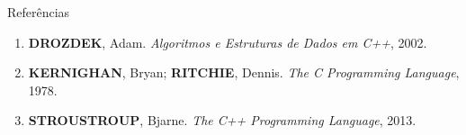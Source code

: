 \begin{frame}[fragile]{Referências}

    \begin{enumerate}
        \item \textbf{DROZDEK}, Adam. \textit{Algoritmos e Estruturas de Dados em C++}, 2002.

        \item \textbf{KERNIGHAN}, Bryan; \textbf{RITCHIE}, Dennis. \textit{The C Programming Language}, 1978.

        \item \textbf{STROUSTROUP}, Bjarne. \textit{The C++ Programming Language}, 2013.
    \end{enumerate}

\end{frame}
